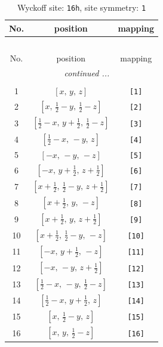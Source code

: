 \documentclass[fleqn,8pt]{jsarticle}
\begin{document}
\begin{longtable}{ccc}
\caption{Wyckoff site: {\tt 16h}, site symmetry: {\tt 1}}
 \\
 \hline \hline
No. & position & mapping \\ \hline \endfirsthead

\multicolumn{2}{l}{\tablename\ \thetable{}} \\
 \hline \hline
No. & position & mapping \\ \hline \endhead

 \hline \hline
\multicolumn{2}{r}{\footnotesize\it continued ...} \\ \endfoot

 \hline \hline
\multicolumn{2}{r}{} \\ \endlastfoot

1 & $\left[ x,\, y,\, z \right]$ & {\tt [1]} \\ \hline
2 & $\left[ x,\, \frac{1}{2} - y,\, \frac{1}{2} - z \right]$ & {\tt [2]} \\ \hline
3 & $\left[ \frac{1}{2} - x,\, y + \frac{1}{2},\, \frac{1}{2} - z \right]$ & {\tt [3]} \\ \hline
4 & $\left[ \frac{1}{2} - x,\, - y,\, z \right]$ & {\tt [4]} \\ \hline
5 & $\left[ - x,\, - y,\, - z \right]$ & {\tt [5]} \\ \hline
6 & $\left[ - x,\, y + \frac{1}{2},\, z + \frac{1}{2} \right]$ & {\tt [6]} \\ \hline
7 & $\left[ x + \frac{1}{2},\, \frac{1}{2} - y,\, z + \frac{1}{2} \right]$ & {\tt [7]} \\ \hline
8 & $\left[ x + \frac{1}{2},\, y,\, - z \right]$ & {\tt [8]} \\ \hline
9 & $\left[ x + \frac{1}{2},\, y,\, z + \frac{1}{2} \right]$ & {\tt [9]} \\ \hline
10 & $\left[ x + \frac{1}{2},\, \frac{1}{2} - y,\, - z \right]$ & {\tt [10]} \\ \hline
11 & $\left[ - x,\, y + \frac{1}{2},\, - z \right]$ & {\tt [11]} \\ \hline
12 & $\left[ - x,\, - y,\, z + \frac{1}{2} \right]$ & {\tt [12]} \\ \hline
13 & $\left[ \frac{1}{2} - x,\, - y,\, \frac{1}{2} - z \right]$ & {\tt [13]} \\ \hline
14 & $\left[ \frac{1}{2} - x,\, y + \frac{1}{2},\, z \right]$ & {\tt [14]} \\ \hline
15 & $\left[ x,\, \frac{1}{2} - y,\, z \right]$ & {\tt [15]} \\ \hline
16 & $\left[ x,\, y,\, \frac{1}{2} - z \right]$ & {\tt [16]} \\
\end{longtable}
\end{document}
